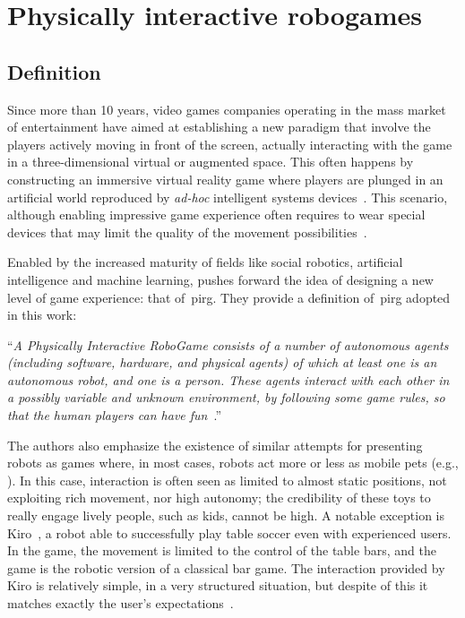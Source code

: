 \chapter{Physically interactive robogames}\label{ch:art}

\section{Definition}
Since more than 10 years, video games companies operating in the mass market of entertainment have aimed at establishing a new paradigm that involve the players actively moving in front of the screen, actually interacting with the game in a three-dimensional virtual or augmented space. This often happens by constructing an immersive virtual reality game where players are plunged in an artificial world reproduced by \textit{ad-hoc} intelligent systems devices~\citep{zyda_visual_2005}. This scenario, although enabling impressive game experience often requires to wear special devices that may limit the quality of the movement possibilities~\citep{martinoia_physically_2013}.

Enabled by the increased maturity of fields like social robotics, artificial intelligence and machine learning, \cite{martinoia_physically_2013} pushes forward the idea of designing a new level of game experience: that of~\glsdesc{pirg}. They provide a definition of~\gls{pirg} adopted in this work:

``\textit{A Physically Interactive RoboGame consists of a number of autonomous agents (including software, hardware, and physical agents) of which at least one is an autonomous robot, and one is a person. These agents interact with each other in a possibly variable and unknown environment, by following some game rules, so that the human players can have fun}~\citep{martinoia_physically_2013}.''

The authors also emphasize the existence of similar attempts for presenting robots as games where, in most cases, robots act more or less as mobile pets (e.g., \cite{fujita_open_1997,shibata_emotional_1996}). In this case, interaction is often seen as limited to almost static positions, not exploiting rich movement, nor high autonomy; the credibility of these toys to really engage lively people, such as kids, cannot be high. A notable exception is Kiro~\citep{weigel_kiro-table_2005}, a robot able to successfully play table soccer even with experienced users. In the game, the movement is limited to the control of the table bars, and the game is the robotic version of a classical bar game. The interaction provided by Kiro is relatively simple, in a very structured situation, but despite of this it matches exactly the user's expectations~\citep{martinoia_physically_2013}.

